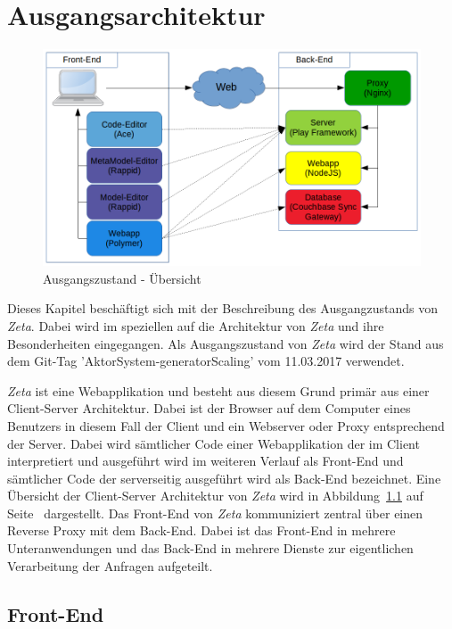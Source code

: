 \chapter{Ausgangsarchitektur}
\label{ch:INITIAL}

\begin{figure}
    \centering
    \includegraphics[width=5in]{figures/overview-before.png}
    \caption{Ausgangszustand - Übersicht}
    \label{fig:ZETA_OVERVIEW_OLD}
\end{figure}

Dieses Kapitel beschäftigt sich mit der Beschreibung des Ausgangzustands von \textit{Zeta}. Dabei wird im speziellen auf die Architektur von \textit{Zeta} und ihre Besonderheiten eingegangen. Als Ausgangszustand von \textit{Zeta} wird der Stand aus dem Git-Tag 'AktorSystem-generatorScaling' vom 11.03.2017 \cite{zeta_tag_old} verwendet.

\textit{Zeta} ist eine Webapplikation und besteht aus diesem Grund primär aus einer Client-Server Architektur. Dabei ist der Browser auf dem Computer eines Benutzers in diesem Fall der Client und ein Webserver oder Proxy entsprechend der Server. Dabei wird sämtlicher Code einer Webapplikation der im Client interpretiert und ausgeführt wird im weiteren Verlauf als Front-End und sämtlicher Code der serverseitig ausgeführt wird als Back-End bezeichnet. Eine Übersicht der Client-Server Architektur von \textit{Zeta} wird in Abbildung~\ref{fig:ZETA_OVERVIEW_OLD} auf Seite~\pageref{fig:ZETA_OVERVIEW_OLD} dargestellt. Das Front-End von \textit{Zeta} kommuniziert zentral über einen Reverse Proxy mit dem Back-End. Dabei ist das Front-End in mehrere Unteranwendungen und das Back-End in mehrere Dienste zur eigentlichen Verarbeitung der Anfragen aufgeteilt.

\section{Front-End}
\label{sec:INITIAL_FRONTEND}

